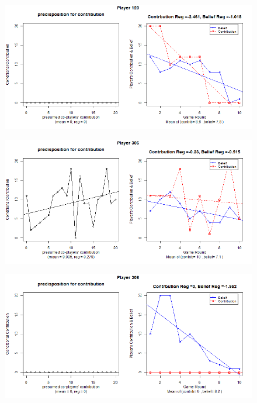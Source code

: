 \begin{figure}[!h]
	\includegraphics[scale=0.5]{images/appendixB/P120.png}
\end{figure}

\begin{figure}[!h]
	\includegraphics[scale=0.5]{images/appendixB/P306.png}
\end{figure}

\begin{figure}[!h]
	\includegraphics[scale=0.5]{images/appendixB/P308.png}
\end{figure}

